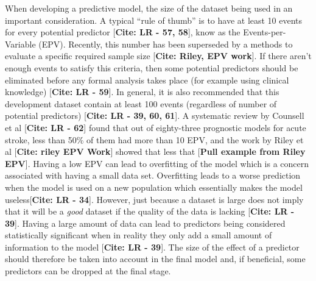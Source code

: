 \documentclass[
]{article}
\begin{document}
When developing a predictive model, the size of the dataset being used in an important consideration. A typical ``rule of thumb'' is to have at least 10 events for every potential predictor {[}\textbf{Cite: LR - 57, 58}{]}, know as the Events-per-Variable (EPV). Recently, this number has been superseded by a methods to evaluate a specific required sample size {[}\textbf{Cite: Riley, EPV work}{]}. If there aren't enough events to satisfy this criteria, then some potential predictors should be eliminated before any formal analysis takes place (for example using clinical knowledge) {[}\textbf{Cite: LR - 59}{]}. In general, it is also recommended that this development dataset contain at least 100 events (regardless of number of potential predictors) {[}\textbf{Cite: LR - 39, 60, 61}{]}. A systematic review by Counsell et al {[}\textbf{Cite: LR - 62}{]} found that out of eighty-three prognostic models for acute stroke, less than 50\% of them had more than 10 EPV, and the work by Riley et al {[}\textbf{Cite: riley EPV Work}{]} showed that less that {[}\textbf{Pull example from Riley EPV}{]}. Having a low EPV can lead to overfitting of the model which is a concern associated with having a small data set. Overfitting leads to a worse prediction when the model is used on a new population which essentially makes the model useless{[}\textbf{Cite: LR - 34}{]}. However, just because a dataset is large does not imply that it will be a \emph{good} dataset if the quality of the data is lacking {[}\textbf{Cite: LR - 39}{]}. Having a large amount of data can lead to predictors being considered statistically significant when in reality they only add a small amount of information to the model {[}\textbf{Cite: LR - 39}{]}. The size of the effect of a predictor should therefore be taken into account in the final model and, if beneficial, some predictors can be dropped at the final stage.
\end{document}

